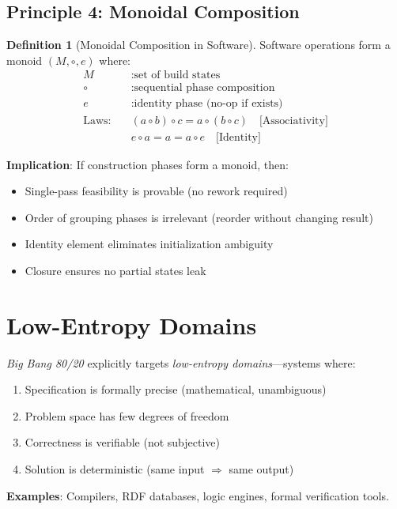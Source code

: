 \documentclass[12pt,oneside,a4paper]{book}
\newcommand{\BB}{\textit{Big Bang 80/20}\xspace}
\theoremstyle{definition}
\newtheorem{definition}{Definition}[chapter]
\begin{document}
\subsection{Principle 4: Monoidal Composition}

\begin{definition}[Monoidal Composition in Software]
Software operations form a monoid $(M, \circ, e)$ where:
\begin{align}
  M &: \text{set of build states} \\
  \circ &: \text{sequential phase composition} \\
  e &: \text{identity phase (no-op if exists)} \\
  \text{Laws:} \quad &(a \circ b) \circ c = a \circ (b \circ c) \quad \text{[Associativity]} \\
  &e \circ a = a = a \circ e \quad \text{[Identity]}
\end{align}
\end{definition}

\textbf{Implication}: If construction phases form a monoid, then:
\begin{itemize}
  \item Single-pass feasibility is provable (no rework required)
  \item Order of grouping phases is irrelevant (reorder without changing result)
  \item Identity element eliminates initialization ambiguity
  \item Closure ensures no partial states leak
\end{itemize}

\section{Low-Entropy Domains}
\label{sec:bb80-entropy}

\BB explicitly targets \emph{low-entropy domains}—systems where:
\begin{enumerate}
  \item Specification is formally precise (mathematical, unambiguous)
  \item Problem space has few degrees of freedom
  \item Correctness is verifiable (not subjective)
  \item Solution is deterministic (same input $\Rightarrow$ same output)
\end{enumerate}

\textbf{Examples}: Compilers, RDF databases, logic engines, formal verification tools.
\end{document}
